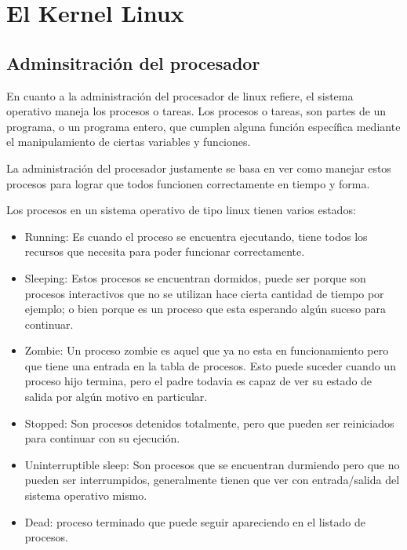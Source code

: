 \documentclass[a4paper, 12pt]{article}
\begin{document}
\section*{El Kernel Linux}

\subsection*{Adminsitraci\'on del procesador}

En cuanto a la administraci\'on del procesador de linux refiere, el sistema operativo maneja los procesos o tareas. Los procesos o tareas, son partes de un programa, o un programa entero, que cumplen alguna funci\'on espec\'ifica mediante el manipulamiento de ciertas variables y funciones. 

La administraci\'on del procesador justamente se basa en ver como manejar estos procesos para lograr que todos funcionen correctamente en tiempo y forma. 

Los procesos en un sistema operativo de tipo linux tienen varios estados:

\begin{itemize}
\item Running: Es cuando el proceso se encuentra ejecutando, tiene todos los recursos que necesita para poder funcionar correctamente.
\item Sleeping: Estos procesos se encuentran dormidos, puede ser porque son procesos interactivos que no se utilizan hace cierta cantidad de tiempo por ejemplo; o bien porque es un proceso que esta esperando alg\'un suceso para continuar.
\item Zombie: Un proceso zombie es aquel que ya no esta en funcionamiento pero que tiene una entrada en la tabla de procesos. Esto puede suceder cuando un proceso hijo termina, pero el padre todavia es capaz de ver su estado de salida por alg\'un motivo en particular. 
\item Stopped: Son procesos detenidos totalmente, pero que pueden ser reiniciados para continuar con su ejecuci\'on. 
\item Uninterruptible sleep: Son procesos que se encuentran durmiendo pero que no pueden ser interrumpidos, generalmente tienen que ver con entrada/salida del sistema operativo mismo.
\item Dead: proceso terminado que puede seguir apareciendo en el listado de procesos.
\end{itemize}
\end{document}
